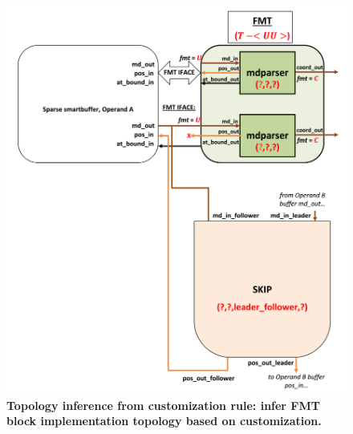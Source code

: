 \begin{figure}[ht]
\includegraphics[width=\textwidth]{figures/safinference_build_03fmttopology.png}
\caption{\textbf{Topology inference from customization rule: infer FMT block implementation topology based on customization. }}
\label{fig:safinference_build_03fmttopology}
\centering
\end{figure}



